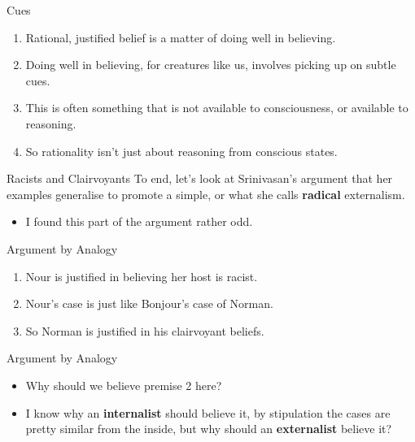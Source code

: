 \documentclass[
  17pt,
  letterpaper,
  ignorenonframetext,
  aspectratio=169,
]{beamer}
\providecommand{\tightlist}{%
  \setlength{\itemsep}{0pt}\setlength{\parskip}{0pt}}\usepackage{longtable,booktabs,array}
\begin{document}
\begin{frame}{Cues}
\protect\hypertarget{cues-1}{}
\begin{enumerate}[<+->]
\tightlist
\item
  Rational, justified belief is a matter of doing well in believing.
\item
  Doing well in believing, for creatures like us, involves picking up on
  subtle cues.
\item
  This is often something that is not available to consciousness, or
  available to reasoning.
\item
  So rationality isn't just about reasoning from conscious states.
\end{enumerate}
\end{frame}

\begin{frame}{Racists and Clairvoyants}
\protect\hypertarget{racists-and-clairvoyants}{}
To end, let's look at Srinivasan's argument that her examples generalise
to promote a simple, or what she calls \textbf{radical} externalism.

\begin{itemize}[<+->]
\tightlist
\item
  I found this part of the argument rather odd.
\end{itemize}
\end{frame}

\begin{frame}{Argument by Analogy}
\protect\hypertarget{argument-by-analogy}{}
\begin{enumerate}[<+->]
\tightlist
\item
  Nour is justified in believing her host is racist.
\item
  Nour's case is just like Bonjour's case of Norman.
\item
  So Norman is justified in his clairvoyant beliefs.
\end{enumerate}
\end{frame}

\begin{frame}{Argument by Analogy}
\protect\hypertarget{argument-by-analogy-1}{}
\begin{itemize}[<+->]
\tightlist
\item
  Why should we believe premise 2 here?
\item
  I know why an \textbf{internalist} should believe it, by stipulation
  the cases are pretty similar from the inside, but why should an
  \textbf{externalist} believe it?
\end{itemize}
\end{frame}
\end{document}
